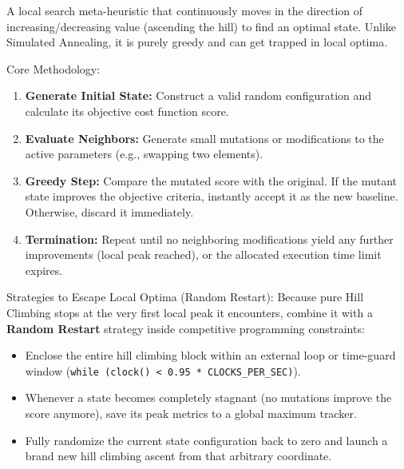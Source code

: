
A local search meta-heuristic that continuously moves in the direction of increasing/decreasing value (ascending the hill) to find an optimal state. Unlike Simulated Annealing, it is purely greedy and can get trapped in local optima.

Core Methodology:
\begin{enumerate}
    \item \textbf{Generate Initial State:} Construct a valid random configuration and calculate its objective cost function score.
    \item \textbf{Evaluate Neighbors:} Generate small mutations or modifications to the active parameters (e.g., swapping two elements).
    \item \textbf{Greedy Step:} Compare the mutated score with the original. If the mutant state improves the objective criteria, instantly accept it as the new baseline. Otherwise, discard it immediately.
    \item \textbf{Termination:} Repeat until no neighboring modifications yield any further improvements (local peak reached), or the allocated execution time limit expires.
\end{enumerate}

Strategies to Escape Local Optima (Random Restart):
Because pure Hill Climbing stops at the very first local peak it encounters, combine it with a \textbf{Random Restart} strategy inside competitive programming constraints:
\begin{itemize}
    \item Enclose the entire hill climbing block within an external loop or time-guard window (\lstinline|while (clock() < 0.95 * CLOCKS_PER_SEC)|).
    \item Whenever a state becomes completely stagnant (no mutations improve the score anymore), save its peak metrics to a global maximum tracker.
    \item Fully randomize the current state configuration back to zero and launch a brand new hill climbing ascent from that arbitrary coordinate.
\end{itemize}
